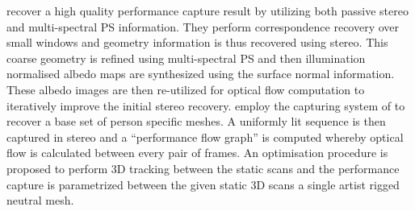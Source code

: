 recover a high quality performance capture result by utilizing both
passive stereo and multi-spectral PS information. They perform
correspondence recovery over small windows and geometry information is thus
recovered using stereo. This coarse geometry is refined using multi-spectral PS
and then illumination normalised albedo maps are synthesized using the surface
normal information. These albedo images are then re-utilized for optical flow
computation to iteratively improve the initial stereo recovery.
\citet{Fyffe:2014hc} employ the capturing system of \citet{ghosh2011multiview}
to recover a base set of person specific meshes. A uniformly lit
sequence is then captured in stereo and a ``performance flow graph'' is
computed whereby optical flow is calculated between every pair of frames.
An optimisation procedure is proposed to perform 3D tracking between the
static scans and the performance capture is parametrized between the given
static 3D scans a single artist rigged neutral mesh.
